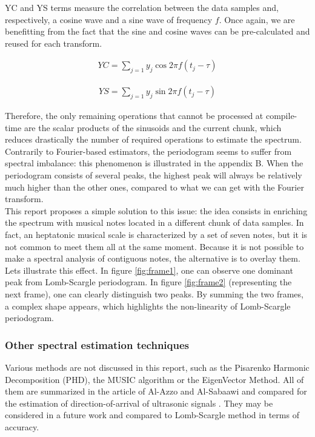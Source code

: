 \documentclass[letterpaper]{article}
\begin{document}
YC and YS terms measure the correlation between the data samples and, respectively, a cosine wave and a sine wave of frequency $f$. Once again, we are
benefitting from the fact that the sine and cosine waves can be pre-calculated and reused for each transform.

\begin{align}
YC = \sum\limits_{j=1} y_{j}\cos 2\pi f (t_{j} - \tau)
\end{align}

\begin{align}
YS = \sum\limits_{j=1} y_{j}\sin 2\pi f (t_{j} - \tau)
\end{align}

Therefore, the only remaining operations that cannot be processed at compile-time are the scalar products of the sinusoids and the current chunk, which
reduces drastically the number of required operations to estimate the spectrum.\\

Contrarily to Fourier-based
estimators, the periodogram seems to suffer from spectral imbalance: this phenomenon is illustrated in the appendix B. When the periodogram consists of several peaks, the highest peak will always be relatively much higher than the other ones, compared to what we can get with the Fourier transform.\\

This report proposes a simple solution to this issue: the idea consists in enriching the spectrum with musical notes located in a different chunk of data samples. In fact, an heptatonic musical scale is characterized by a set of seven notes, but it is
not common to meet them all at the same moment. Because it is not possible to make a spectral analysis of contiguous notes, the alternative is to overlay them.
Let\textquotesingle s illustrate this effect. In figure \ref{fig:frame1}, 
one can observe one dominant peak from Lomb-Scargle periodogram. In figure \ref{fig:frame2} (representing the next frame), one can clearly distinguish two peaks. By summing the two frames, a complex shape appears, which highlights the non-linearity of Lomb-Scargle periodogram.\\

\subsubsection{Other spectral estimation techniques}

Various methods are not discussed in this report, such as the Pisarenko Harmonic Decomposition (PHD), the MUSIC algorithm or the EigenVector Method. All of them are summarized in the article of Al-Azzo and Al-Sabaawi and compared for the estimation of direction-of-arrival of ultrasonic signals \citep{MA}. They may be considered in a future work and compared to Lomb-Scargle method in terms of accuracy.
\end{document}
